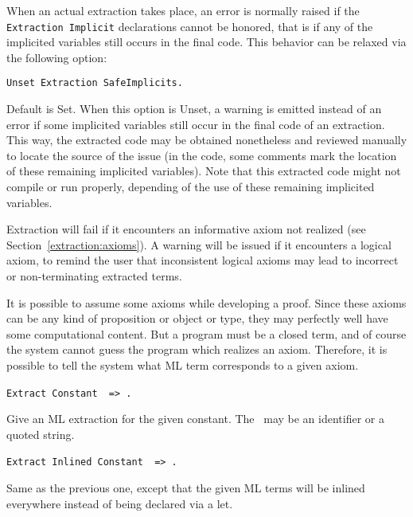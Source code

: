 \noindent When an actual extraction takes place, an error is normally raised if the
{\tt Extraction Implicit}
declarations cannot be honored, that is if any of the implicited
variables still occurs in the final code. This behavior can be relaxed
via the following option:

\begin{description}
\item {} {\tt Unset Extraction SafeImplicits.}

Default is Set. When this option is Unset, a warning is emitted
instead of an error if some implicited variables still occur in the
final code of an extraction. This way, the extracted code may be
obtained nonetheless and reviewed manually to locate the source of the issue
(in the code, some comments mark the location of these remaining
implicited variables).
Note that this extracted code might not compile or run properly,
depending of the use of these remaining implicited variables.

\end{description}

\label{extraction:axioms}

Extraction will fail if it encounters an informative
axiom not realized (see Section~\ref{extraction:axioms}). 
A warning will be issued if it encounters a logical axiom, to remind the
user that inconsistent logical axioms may lead to incorrect or
non-terminating extracted terms. 

It is possible to assume some axioms while developing a proof. Since
these axioms can be any kind of proposition or object or type, they may
perfectly well have some computational content. But a program must be
a closed term, and of course the system cannot guess the program which
realizes an axiom.  Therefore, it is possible to tell the system
what ML term corresponds to a given axiom. 

\begin{description}
\item{\tt Extract Constant \qualid\ => \str.} ~\par
  Give an ML extraction for the given constant.
  The \str\ may be an identifier or a quoted string.
\item{\tt Extract Inlined Constant \qualid\ => \str.} ~\par
  Same as the previous one, except that the given ML terms will
  be inlined everywhere instead of being declared via a let.
\end{description}

